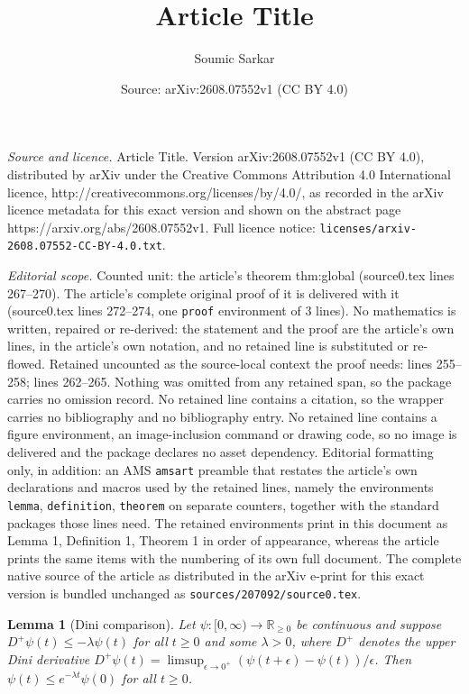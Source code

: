 \documentclass[10pt,a4paper]{amsart}
\title{Article Title}
\author{Soumic Sarkar}
\date{Source: arXiv:2608.07552v1 (CC BY 4.0)}
\newtheorem{lemma}{Lemma}
\begin{document}
\maketitle

\noindent\emph{Source and licence.} Article Title. Version arXiv:2608.07552v1 (CC BY 4.0), distributed by arXiv under the Creative Commons Attribution 4.0 International licence, http://creativecommons.org/licenses/by/4.0/, as recorded in the arXiv licence metadata for this exact version and shown on the abstract page https://arxiv.org/abs/2608.07552v1. Full licence notice: \texttt{licenses/arxiv-2608.07552-CC-BY-4.0.txt}.\par\smallskip

\noindent\textit{Editorial scope.} Counted unit: the article's theorem thm:global (source0.tex lines 267--270). The article's complete original proof of it is delivered with it (source0.tex lines 272--274, one \texttt{proof} environment of 3 lines). No mathematics is written, repaired or re-derived: the statement and the proof are the article's own lines, in the article's own notation, and no retained line is substituted or re-flowed.  Retained uncounted as the source-local context the proof needs: lines 255--258; lines 262--265.  Nothing was omitted from any retained span, so the package carries no omission record.  No retained line contains a citation, so the wrapper carries no bibliography and no bibliography entry.  No retained line contains a figure environment, an image-inclusion command or drawing code, so no image is delivered and the package declares no asset dependency.  Editorial formatting only, in addition: an AMS \texttt{amsart} preamble that restates the article's own declarations and macros used by the retained lines, namely the environments \texttt{lemma}, \texttt{definition}, \texttt{theorem} on separate counters, together with the standard packages those lines need.  The retained environments print in this document as Lemma 1, Definition 1, Theorem 1 in order of appearance, whereas the article prints the same items with the numbering of its own full document.  The complete native source of the article as distributed in the arXiv e-print for this exact version is bundled unchanged as \texttt{sources/207092/source0.tex}.
\begin{lemma}[Dini comparison]
\label{lem:dini}
Let $\psi:[0,\infty)\to\mathbb{R}_{\ge0}$ be continuous and suppose $D^+\psi(t)\le-\lambda\psi(t)$ for all $t\ge0$ and some $\lambda>0$, where $D^+$ denotes the upper Dini derivative $D^+\psi(t)=\limsup_{\epsilon\to0^+}(\psi(t+\epsilon)-\psi(t))/\epsilon$. Then $\psi(t)\le e^{-\lambda t}\psi(0)$ for all $t\ge0$.
\end{lemma}
\end{document}
